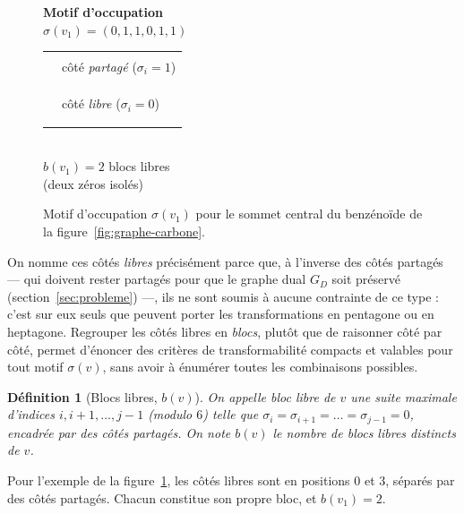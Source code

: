 \documentclass[11pt,a4paper]{article}
\newcommand{\GD}{\ensuremath{G_D}}                 %
\newtheorem{definition}{Définition}
\begin{document}
\begin{figure}[h]
\hspace{0.8cm}
\begin{minipage}[c]{0.32\linewidth}
\centering
\small
\textbf{Motif d'occupation}\\[0.3em]
$\sigma(v_1) = (0, 1, 1, 0, 1, 1)$\\[0.6em]
\begin{tabular}{cl}
\textcolor{blue!70!black}{\rule{1em}{1pt}} & côté \emph{partagé} ($\sigma_i = 1$) \\[0.2em]
\textcolor{red!70!black}{\rule{1em}{1pt}\hspace{-1em}\rule{1em}{1pt}} & côté \emph{libre} ($\sigma_i = 0$) \\
\end{tabular}\\[0.5em]
$b(v_1) = 2$ blocs libres\\[0.2em]
(deux zéros isolés)
\end{minipage}
\caption{Motif d'occupation $\sigma(v_1)$ pour le sommet central du
benzénoïde de la figure~\ref{fig:graphe-carbone}.}
\label{fig:sigma-v1}
\end{figure}

On nomme ces côtés \emph{libres} précisément parce que, à l'inverse des
côtés partagés --- qui doivent rester partagés pour que le graphe dual
\GD{} soit préservé (section~\ref{sec:probleme}) ---, ils ne sont
soumis à aucune contrainte de ce type : c'est sur eux seuls que peuvent
porter les transformations en pentagone ou en heptagone. Regrouper les
côtés libres en \emph{blocs}, plutôt que de raisonner côté par côté,
permet d'énoncer des critères de transformabilité compacts et valables
pour tout motif $\sigma(v)$, sans avoir à énumérer toutes les
combinaisons possibles.

\begin{definition}[Blocs libres, $b(v)$]
On appelle \emph{bloc libre} de $v$ une suite maximale d'indices
$i, i+1, \dots, j-1$ (modulo $6$) telle que
$\sigma_i = \sigma_{i+1} = \dots = \sigma_{j-1} = 0$, encadrée par
des côtés partagés. On note $b(v)$ le nombre de blocs libres
distincts de $v$.
\end{definition}

Pour l'exemple de la figure~\ref{fig:sigma-v1}, les côtés libres sont
en positions $0$ et $3$, séparés par des côtés partagés. Chacun
constitue son propre bloc, et $b(v_1) = 2$.
\end{document}
